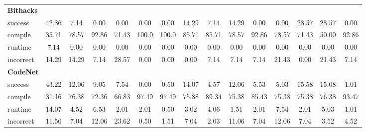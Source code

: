 \begin{table}[t]
\begin{tabular}{@{}lcccccccccccccc@{}}
\textbf{Bithacks} & & & & & & & & & & & & & & \\ 
\quad success & 42.86 & 7.14 & 0.00 & 0.00 & 0.00 & 0.00 & 14.29 & 7.14 & 14.29 & 0.00 & 0.00 & 28.57 & 28.57 & 0.00 \\
\qquad compile & 35.71 & 78.57 & 92.86 & 71.43 & 100.0 & 100.0 & 85.71 & 85.71 & 78.57 & 92.86 & 78.57 & 71.43 & 50.00 & 92.86 \\
\qquad runtime & 7.14 & 0.00 & 0.00 & 0.00 & 0.00 & 0.00 & 0.00 & 0.00 & 0.00 & 0.00 & 0.00 & 0.00 & 0.00 & 0.00 \\
\qquad incorrect & 14.29 & 14.29 & 7.14 & 28.57 & 0.00 & 0.00 & 0.00 & 7.14 & 7.14 & 7.14 & 21.43 & 0.00 & 21.43 & 7.14 \\
 

\textbf{CodeNet} & & & & & & & & & & & & & & \\ 
\quad success & 43.22 & 12.06 & 9.05 & 7.54 & 0.00 & 0.50 & 14.07 & 4.57 & 12.06 & 5.53 & 5.03 & 15.58 & 15.08 & 1.01 \\
\qquad compile & 31.16 & 76.38 & 72.36 & 66.83 & 97.49 & 97.49 & 75.88 & 89.34 & 75.38 & 85.43 & 75.38 & 75.38 & 76.38 & 93.47 \\
\qquad runtime & 14.07 & 4.52 & 6.53 & 2.01 & 2.01 & 0.50 & 3.02 & 4.06 & 1.51 & 2.01 & 7.54 & 2.01 & 5.03 & 1.01 \\
\qquad incorrect & 11.56 & 7.04 & 12.06 & 23.62 & 0.50 & 1.51 & 7.04 & 2.03 & 11.06 & 7.04 & 12.06 & 7.04 & 3.52 & 4.52 \\
 

\bottomrule
\end{tabular}
\end{table}




